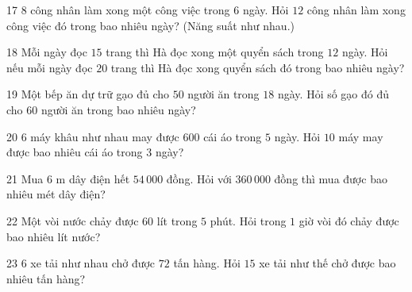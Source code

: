 \gap
\begin{probbox}{17}{\relax}
$8$ công nhân làm xong một công việc trong $6$ ngày. Hỏi $12$ công nhân làm xong công việc đó trong bao nhiêu ngày? (Năng suất như nhau.)
\end{probbox}
\gap
\begin{probbox}{18}{\relax}
Mỗi ngày đọc $15$ trang thì Hà đọc xong một quyển sách trong $12$ ngày. Hỏi nếu mỗi ngày đọc $20$ trang thì Hà đọc xong quyển sách đó trong bao nhiêu ngày?
\end{probbox}
\gap
\begin{probbox}{19}{\relax}
Một bếp ăn dự trữ gạo đủ cho $50$ người ăn trong $18$ ngày. Hỏi số gạo đó đủ cho $60$ người ăn trong bao nhiêu ngày?
\end{probbox}
\gap
\begin{probbox}{20}{\relax}
$6$ máy khâu như nhau may được $600$ cái áo trong $5$ ngày. Hỏi $10$ máy may được bao nhiêu cái áo trong $3$ ngày?
\end{probbox}
\gap
\begin{probbox}{21}{\relax}
Mua $6$ m dây điện hết $54\,000$ đồng. Hỏi với $360\,000$ đồng thì mua được bao nhiêu mét dây điện?
\end{probbox}
\gap
\begin{probbox}{22}{\relax}
Một vòi nước chảy được $60$ lít trong $5$ phút. Hỏi trong $1$ giờ vòi đó chảy được bao nhiêu lít nước?
\end{probbox}
\gap
\begin{probbox}{23}{\relax}
$6$ xe tải như nhau chở được $72$ tấn hàng. Hỏi $15$ xe tải như thế chở được bao nhiêu tấn hàng?
\end{probbox}
